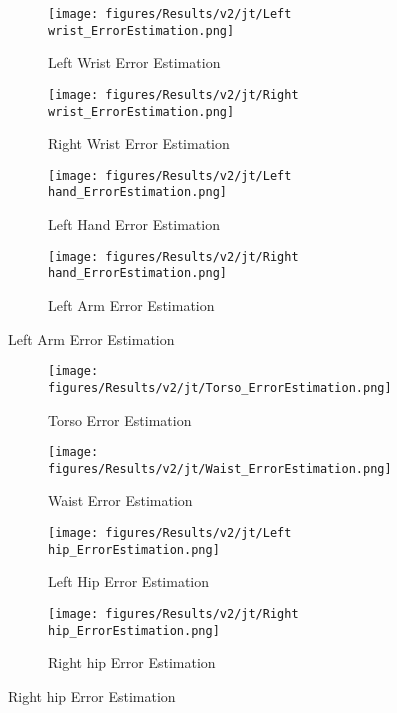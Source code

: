   
  \begin{figure}[!ht]
    \centering
    \begin{subfigure}[b]{0.47\linewidth}
        \centering
        \texttt{[image: figures/Results/v2/jt/Left wrist\_ErrorEstimation.png]}
        \caption{Left Wrist Error Estimation}
        \label{fig:v2_lewr_jt_ee}
    \end{subfigure}
    \hfill
    \begin{subfigure}[b]{0.47\linewidth}
        \centering
        \texttt{[image: figures/Results/v2/jt/Right wrist\_ErrorEstimation.png]}
        \caption{Right Wrist Error Estimation}
        \label{fig:v2_riwr_jt_ee}
    \end{subfigure}
    \hfill
    \begin{subfigure}[b]{0.47\linewidth}
        \centering
        \texttt{[image: figures/Results/v2/jt/Left hand\_ErrorEstimation.png]}
        \caption{Left Hand Error Estimation}
        \label{fig:v2_leha_jt_ee}
    \end{subfigure}
    \hfill
    \begin{subfigure}[b]{0.47\linewidth}
        \centering
        \texttt{[image: figures/Results/v2/jt/Right hand\_ErrorEstimation.png]}
        \caption{Left Arm Error Estimation}
        \label{fig:v2_riha_jt_ee}
    \end{subfigure}
  \end{figure}
  
  \begin{figure}[!ht]
    \centering
    \begin{subfigure}[b]{0.47\linewidth}
        \centering
        \texttt{[image: figures/Results/v2/jt/Torso\_ErrorEstimation.png]}
        \caption{Torso Error Estimation}
        \label{fig:v2_torso_jt_ee}
    \end{subfigure}
    \hfill
    \begin{subfigure}[b]{0.47\linewidth}
      \centering
      \texttt{[image: figures/Results/v2/jt/Waist\_ErrorEstimation.png]}
      \caption{Waist Error Estimation}
      \label{fig:v2_waist_jt_ee}
    \end{subfigure}
    \hfill
    \begin{subfigure}[b]{0.47\linewidth}
        \centering
        \texttt{[image: figures/Results/v2/jt/Left hip\_ErrorEstimation.png]}
        \caption{Left Hip Error Estimation}
        \label{fig:v2_lehi_jt_ee}
    \end{subfigure}
    \hfill
    \begin{subfigure}[b]{0.47\linewidth}
        \centering
        \texttt{[image: figures/Results/v2/jt/Right hip\_ErrorEstimation.png]}
        \caption{Right hip Error Estimation}
        \label{fig:v2_rihi_jt_ee}
    \end{subfigure}
  \end{figure}
  
